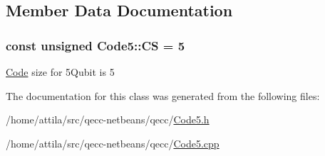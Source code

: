 \subsection{Member Data Documentation}
\subsubsection[{\texorpdfstring{CS}{CS}}]{\setlength{\rightskip}{0pt plus 5cm}const unsigned Code5\+::\+CS = 5\hspace{0.3cm}{\ttfamily [static]}}\hypertarget{class_code5_ac252f1c41568341657456564d0417630}{}\label{class_code5_ac252f1c41568341657456564d0417630}
\hyperlink{class_code}{Code} size for 5\+Qubit is 5 

The documentation for this class was generated from the following files\+:\begin{DoxyCompactItemize}
\item 
/home/attila/src/qecc-\/netbeans/qecc/\hyperlink{_code5_8h}{Code5.\+h}\item 
/home/attila/src/qecc-\/netbeans/qecc/\hyperlink{_code5_8cpp}{Code5.\+cpp}\end{DoxyCompactItemize}
